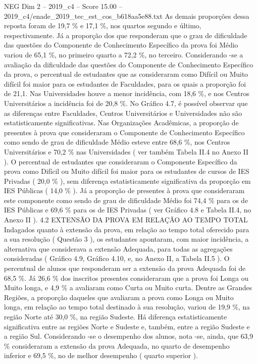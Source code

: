 \begin{textsample}{NEG Dim 2 – 2019\_c4 – Score 15.00 – 2019\_c4/enade\_2019\_tec\_est\_cos\_b618aa5e88.txt}
As demais proporções dessa reposta foram de 19,7 \% e 17,1 \%, nos quartos segundo e último, respectivamente.
Já a proporção dos que responderam que o grau de dificuldade das questões do Componente de Conhecimento Específico da prova foi Médio variou de 65,1 \%, no primeiro quarto a 72,2 \%, no terceiro.
Considerando -se a avaliação da dificuldade das questões do Componente de Conhecimento Específico da prova, o percentual de estudantes que as consideraram como Difícil ou Muito difícil foi maior para os estudantes de Faculdades, para os quais a proporção foi de 21,1.
Nas Universidades houve a menor incidência, com 18,6 \%, e nos Centros Universitários a incidência foi de 20,8 \%.
No Gráfico 4.7, é possível observar que as diferenças entre Faculdades, Centros Universitários e Universidades não são estatisticamente significativas.
Nas Organizações Acadêmicas, a proporção de presentes à prova que consideraram o Componente de Conhecimento Específico como sendo de grau de dificuldade Médio esteve entre 68,6 \%, nos Centros Universitários e 70,2 \% nas Universidades ( ver também Tabela II.4 no Anexo II ).
O percentual de estudantes que consideraram o Componente Específico da prova como Difícil ou Muito difícil foi maior para os estudantes de cursos de IES Privadas ( 20,0 \% ), sem diferença estatisticamente significativa da proporção em IES Públicas ( 14,0 \% ).
Já a proporção de presentes à prova que consideraram este componente como sendo de grau de dificuldade Médio foi 74,4 \% para os de IES Públicas e 69,6 \% para os de IES Privadas ( ver Gráfico 4.8 e Tabela II.4, no Anexo II ). 4.2 EXTENSÃO DA PROVA EM RELAÇÃO AO TEMPO TOTAL Indagados quanto à extensão da prova, em relação ao tempo total oferecido para a sua resolução ( Questão 3 ), os estudantes apontaram, com maior incidência, a alternativa que considerava a extensão Adequada, para todas as agregações consideradas ( Gráfico 4.9, Gráfico 4.10, e, no Anexo II, a Tabela II.5 ).
O percentual de alunos que responderam ser a extensão da prova Adequada foi de 68,5 \%.
Já 26,6 \% dos inscritos presentes consideraram que a prova foi Longa ou Muito longa, e 4,9 \% a avaliaram como Curta ou Muito curta.
Dentre as Grandes Regiões, a proporção daqueles que avaliaram a prova como Longa ou Muito longa, em relação ao tempo total destinado à sua resolução, variou de 19,9 \%, na região Norte até 30,0 \%, na região Sudeste.
Há diferença estatisticamente significativa entre as regiões Norte e Sudeste e, também, entre a região Sudeste e a região Sul.
Considerando -se o desempenho dos alunos, nota -se, ainda, que 63,9 \% consideraram a extensão da prova Adequada, no quarto de desempenho inferior e 69,5 \%, no de melhor desempenho ( quarto superior ).

\end{textsample}
